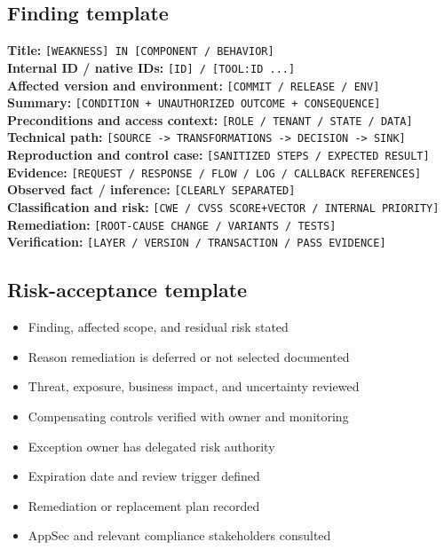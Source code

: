 \documentclass[11pt,letterpaper]{article}
\newcommand{\field}[1]{\texttt{#1}}
\newcommand{\checkitem}{\item[$\square$]}
\begin{document}
\subsection{Finding template}

\begin{tcolorbox}[enhanced,breakable,colback=Cloud,colframe=Slate,boxrule=0.6pt,arc=2mm]
\textbf{Title:} \field{[WEAKNESS] IN [COMPONENT / BEHAVIOR]}\\
\textbf{Internal ID / native IDs:} \field{[ID] / [TOOL:ID ...]}\\
\textbf{Affected version and environment:} \field{[COMMIT / RELEASE / ENV]}\\
\textbf{Summary:} \field{[CONDITION + UNAUTHORIZED OUTCOME + CONSEQUENCE]}\\
\textbf{Preconditions and access context:} \field{[ROLE / TENANT / STATE / DATA]}\\
\textbf{Technical path:} \field{[SOURCE -> TRANSFORMATIONS -> DECISION -> SINK]}\\
\textbf{Reproduction and control case:} \field{[SANITIZED STEPS / EXPECTED RESULT]}\\
\textbf{Evidence:} \field{[REQUEST / RESPONSE / FLOW / LOG / CALLBACK REFERENCES]}\\
\textbf{Observed fact / inference:} \field{[CLEARLY SEPARATED]}\\
\textbf{Classification and risk:} \field{[CWE / CVSS SCORE+VECTOR / INTERNAL PRIORITY]}\\
\textbf{Remediation:} \field{[ROOT-CAUSE CHANGE / VARIANTS / TESTS]}\\
\textbf{Verification:} \field{[LAYER / VERSION / TRANSACTION / PASS EVIDENCE]}
\end{tcolorbox}

\subsection{Risk-acceptance template}

\begin{itemize}
  \checkitem Finding, affected scope, and residual risk stated
  \checkitem Reason remediation is deferred or not selected documented
  \checkitem Threat, exposure, business impact, and uncertainty reviewed
  \checkitem Compensating controls verified with owner and monitoring
  \checkitem Exception owner has delegated risk authority
  \checkitem Expiration date and review trigger defined
  \checkitem Remediation or replacement plan recorded
  \checkitem AppSec and relevant compliance stakeholders consulted
\end{itemize}
\end{document}
